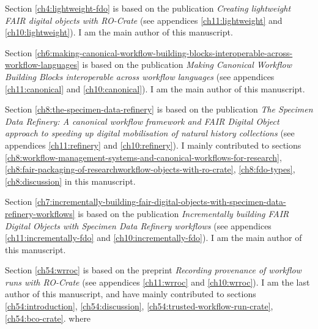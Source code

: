 Section \ref{ch4:lightweight-fdo} is based on the publication \emph{Creating lightweight FAIR digital objects with RO-Crate} \cite{10.3897/rio.8.e93937} (see appendices \ref{ch11:lightweight} and \ref{ch10:lightweight}). I am the main author of this manuscript.

Section \ref{ch6:making-canonical-workflow-building-blocks-interoperable-across-workflow-languages} is based on the publication \emph{Making Canonical Workflow Building Blocks interoperable across workflow languages} \cite{Soiland-Reyes 2022b} (see appendices \ref{ch11:canonical} and \ref{ch10:canonical}). I am the main author of this manuscript.

Section \ref{ch8:the-specimen-data-refinery} is based on the publication \emph{The Specimen Data Refinery: A
canonical workflow framework and FAIR Digital Object approach to speeding up digital mobilisation of natural history collections} \cite{Hardisty 2022} (see appendices \ref{ch11:refinery} and \ref{ch10:refinery}). I mainly contributed to sections \ref{ch8:workflow-management-systems-and-canonical-workflows-for-research}, \ref{ch8:fair-packaging-of-researchworkflow-objects-with-ro-crate}, \ref{ch8:fdo-types}, \ref{ch8:discussion} in this manuscript.

Section \ref{ch7:incrementally-building-fair-digital-objects-with-specimen-data-refinery-workflows} is based on the publication \emph{Incrementally building FAIR Digital Objects with Specimen Data
Refinery workflows} \cite{Woolland 2022} (see appendices \ref{ch11:incrementally-fdo} and \ref{ch10:incrementally-fdo}). I am the main author of this manuscript.

Section \ref{ch54:wrroc} is based on the preprint \emph{
Recording provenance of workflow runs with RO-Crate} \cite{workflow-run-crate} (see appendices \ref{ch11:wrroc} and \ref{ch10:wrroc}). I am the last author of this manuscript, and have mainly contributed to sections \ref{ch54:introduction}, \ref{ch54:discussion}, \ref{ch54:trusted-workflow-run-crate}, \ref{ch54:bco-crate}.
where